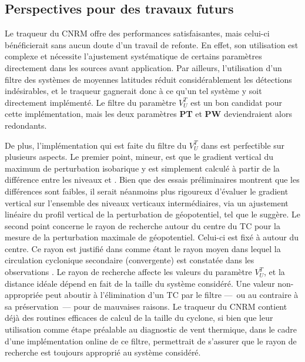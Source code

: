 \documentclass[../main.tex]{subfiles}
\begin{document}
\subsection*{Perspectives pour des travaux futurs}

Le traqueur du CNRM offre des performances satisfaisantes, mais celui-ci bénéficierait sans aucun doute d'un travail de refonte. En effet, son utilisation est
complexe et nécessite l'ajustement systématique de certains paramètres directement dans les sources avant application. Par ailleurs, l'utilisation d'un filtre
des systèmes de moyennes latitudes réduit considérablement les détections indésirables, et le traqueur gagnerait donc à ce qu'un tel système y soit
directement implémenté. Le filtre du paramètre $V_U^T$ est un bon candidat pour cette implémentation, mais les deux paramètres \textbf{PT} et \textbf{PW}
deviendraient alors redondants.

De plus, l'implémentation qui est faite du filtre du $V_U^T$ dans \textcite{dulac_assessing_2023} est perfectible sur plusieurs aspects. Le premier point,
mineur, est que le gradient vertical du maximum de perturbation isobarique y est simplement calculé à partir de la différence entre les niveaux  et
. Bien que des essais préliminaires montrent que les différences sont faibles, il serait néanmoins plus rigoureux d'évaluer le gradient vertical sur
l'ensemble des niveaux verticaux intermédiaires, via un ajustement linéaire du profil vertical de la perturbation de géopotentiel, tel que
\textcite{hart_cyclone_2003} le suggère. Le second point concerne le rayon de recherche autour du centre du TC pour la mesure de la perturbation maximale de
géopotentiel. Celui-ci est fixé à  autour du centre. Ce rayon est justifié dans \textcite{hart_cyclone_2003} comme étant le rayon moyen dans lequel la
circulation cyclonique secondaire (convergente) est constatée dans les observations \parencite{frank_structure_1977}. Le rayon de recherche affecte les valeurs
du paramètre $V_U^T$, et la distance idéale dépend en fait de la taille du système considéré. Une valeur non-appropriée peut aboutir à l'élimination d'un TC par
le filtre ---~ou au contraire à sa préservation~--- pour de mauvaises raisons. Le traqueur du CNRM contient déjà des routines efficaces de calcul de la taille
du cyclone, si bien que leur utilisation comme étape préalable au diagnostic de vent thermique, dans le cadre d'une implémentation online de ce filtre,
permettrait de s'assurer que le rayon de recherche est toujours approprié au système considéré.
\end{document}
